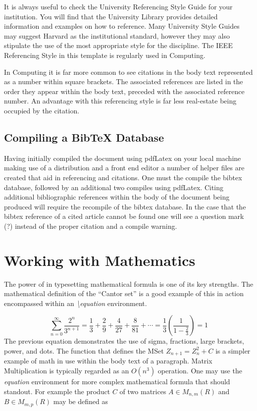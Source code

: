 It is always useful to check the University Referencing Style Guide for your institution. You will find that the University Library provides detailed information and examples on how to reference. Many University Style Guides may suggest Harvard as the institutional standard, however they may also stipulate the use of the most appropriate style for the discipline. The IEEE Referencing Style in this template is regularly used in Computing.      

In Computing it is far more common to see citations in the body text represented as a number within square brackets. The associated references are listed in the order they appear within the body text, preceded with the associated reference number. An advantage with this referencing style is far less real-estate being occupied by the citation. 

\subsection{Compiling a BibTeX Database}

Having initially compiled the document using pdfLatex on your local machine making use of a \latex distribution and a front end editor a number of helper files are created that aid in referencing and citations. One must the compile the bibtex database, followed by an additional two compiles using pdfLatex. Citing additional bibliographic references within the body of the document being produced will require the recompile of the bibtex database. In the case that the bibtex reference of a cited article cannot be found one will see a question mark (?) instead of the proper citation and a compile warning.

\section{Working with Mathematics}\label{using:sec:WorkWithMath}
The power of \latex in typesetting mathematical formula is one of its key strengths. The mathematical definition of the ``Cantor set'' is a good example of this in action encompassed within an \emph{\textbackslash equation} environment.

\begin{equation}
\displaystyle\sum_{n=0}^\infty \frac{2^n}{3^{n+1}} = \frac{1}{3} +
\frac{2}{9} + \frac{4}{27} + \frac{8}{81} + \cdots =
\frac{1}{3}\left(\frac{1}{1-\frac{2}{3}}\right) = 1
\end{equation}
 The previous equation demonstrates the use of sigma, fractions, large brackets, power, and dots. The function that defines the MSet $Z_{n+1} =
Z_{n}^2 + C$ is a simpler example of math in use within the body text of a paragraph. Matrix Multiplication is typically regarded as an $O(n^3)$
operation. One may use the \emph{equation} environment for more complex mathematical formula that should standout. For example the product  $C$ of two matrices $A \in M_{n,m}(R)$ and $B \in
M_{m,p}(R)$ may be defined as

